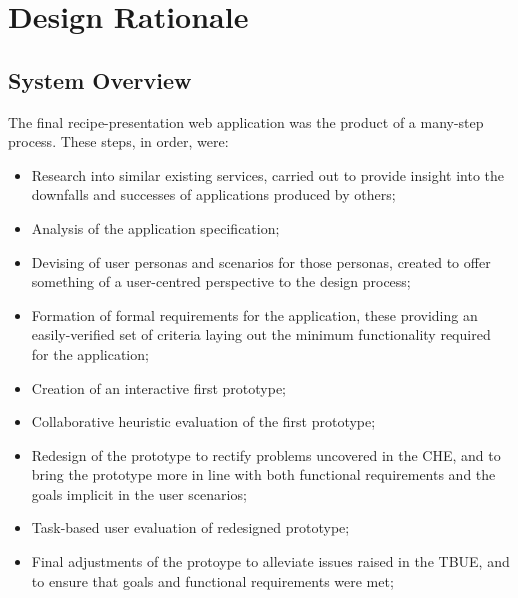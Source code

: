 \section{Design Rationale}

\subsection{System Overview}
The final recipe-presentation web application was the product of a many-step process. These steps, in order, were:
\begin{itemize}
  \item Research into similar existing services, carried out to provide insight into the downfalls and successes of applications produced by others;
  \item Analysis of the application specification;
  \item Devising of user personas and scenarios for those personas, created to offer something of a user-centred perspective to the design process;
  \item Formation of formal requirements for the application, these providing an easily-verified set of criteria laying out the minimum functionality required for the application;
  \item Creation of an interactive first prototype;
  \item Collaborative heuristic evaluation of the first prototype;
  \item Redesign of the prototype to rectify problems uncovered in the CHE, and to bring the prototype more in line with both functional requirements and the goals implicit in the user scenarios;
  \item Task-based user evaluation of redesigned prototype;
  \item Final adjustments of the protoype to alleviate issues raised in the TBUE, and to ensure that goals and functional requirements were met;
\end{itemize}

